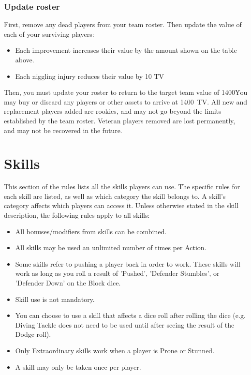 \documentclass{article}
\newcommand\TV{1400}
\begin{document}
\begin{multicols}{2}
\subsubsection{Update roster}
\par First, remove any dead players from your team roster. Then update the value of each of your surviving players:

\begin{itemize}
\item Each improvement increases their value by the amount shown on the table above.
\item Each niggling injury reduces their value by 10 TV
\end{itemize}

\par Then, you must update your roster to return to the target team value of \TV\. You may buy or discard any players or other assets to arrive at \TV\ TV. All new and replacement players added are rookies, and may not go beyond the limits established by the team roster. Veteran players removed are lost permanently, and may not be recovered in the future.

\end{multicols}

\section{Skills}
\par This section of the rules lists all the skills players can use. The specific rules for each skill are listed, as well as which category the skill belongs to. A skill's category affects which players can access it. Unless otherwise stated in the skill description, the following rules apply to all skills:

\begin{itemize}
\item All bonuses/modifiers from skills can be combined.
\item All skills may be used an unlimited number of times per Action.
\item Some skills refer to pushing a player back in order to work. These skills will work as long as you roll a result of 'Pushed', 'Defender Stumbles', or 'Defender Down' on the Block dice.
\item Skill use is not mandatory.
\item You can choose to use a skill that affects a dice roll after rolling the dice (e.g. Diving Tackle does not need to be used until after seeing the result of the Dodge roll).
\item Only Extraordinary skills work when a player is Prone or Stunned.
\item A skill may only be taken once per player.
\end{itemize}
\end{document}
